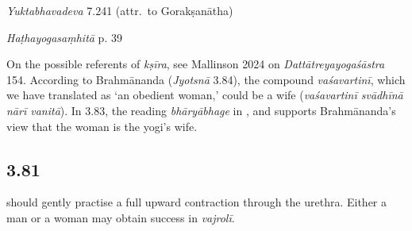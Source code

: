 \begin{ekdosis}
\begin{testimonia}[hp03_080]
\emph{Yuktabhavadeva} 7.241 (attr.~to Gorakṣanātha)
\begin{versinnote}
\end{versinnote}

\emph{Haṭhayogasaṃhitā} p. 39
\begin{versinnote}
\end{versinnote}

\end{testimonia}

\begin{philcomm}[hp03_080]
On the possible referents of \emph{kṣīra}, see Mallinson 2024 on \emph{Dattātreyayogaśāstra} 154. According to Brahmānanda (\emph{Jyotsnā} 3.84), the compound \emph{vaśavartinī}, which we have translated as `an obedient woman,' could be a wife (\emph{vaśavartinī svādhīnā nārī vanitā}). In 3.83, the reading \emph{bhāryābhage} in ,  and  supports Brahmānanda's view that the woman is the yogi's wife. 
\end{philcomm}


\subsection*{3.81}
\begin{translation} should gently practise a full upward contraction through the urethra. Either a man or a woman may obtain success in \emph{vajrolī}.
\end{translation}


\end{ekdosis}
